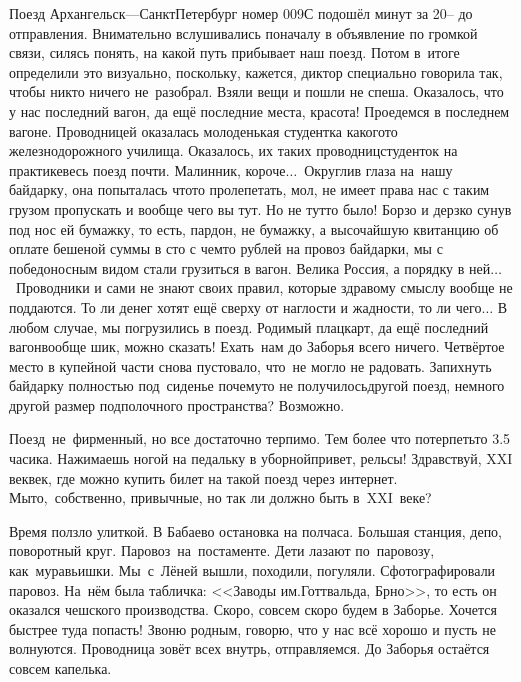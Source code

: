 Поезд Архангельск\thinspace\nobreakdash---\thinspace Санкт\sdash Петербург номер 009С подошёл минут за 20\thinspace\nobreakdash-- до отправления. Внимательно вслушивались поначалу в объявление по громкой связи, силясь понять, на какой путь прибывает наш поезд. Потом в~итоге определили это визуально, поскольку, кажется, диктор специально говорила так, чтобы никто ничего не~разобрал. Взяли вещи и пошли не спеша. Оказалось, что у нас последний вагон, да ещё последние места, красота! Проедемся в последнем вагоне. Проводницей оказалась молоденькая студентка какого\sdash то железнодорожного училища. Оказалось, их таких проводниц\sdash студенток на практике\mdash весь поезд почти. Малинник, короче$\ldots$~Округлив глаза на~нашу байдарку, она попыталась что\sdash то пролепетать, мол, не имеет права нас с таким грузом пропускать и вообще чего вы тут. Но не тут\sdash то было! Борзо и дерзко сунув под нос ей бумажку, то есть, пардон, не бумажку, а высочайшую квитанцию об оплате бешеной суммы в сто с чем\sdash то рублей на провоз байдарки, мы с победоносным видом стали грузиться в вагон. Велика Россия, а порядку в ней$\ldots$~Проводники и сами не знают своих правил, которые здравому смыслу вообще не поддаются. То ли денег хотят ещё сверху от наглости и жадности, то ли чего$\ldots$
\newpage
В любом случае, мы погрузились в поезд. Родимый плацкарт, да ещё последний вагон\mdash вообще шик, можно сказать! Ехать~нам до Заборья всего ничего. Четвёртое место в купейной части снова пустовало, что~не могло не радовать. Запихнуть байдарку полностью под~сиденье почему\sdash то не получилось\mdash другой поезд, немного другой размер подполочного пространства? Возможно. 

Поезд~не~фирменный, но все достаточно терпимо. Тем более что потерпеть\sdash то 3.5 часика. Нажимаешь ногой на педальку в уборной\mdash привет, рельсы! Здравствуй, XXI век\mdash век, где можно купить билет на такой поезд через интернет. Мы\sdash то,~собственно, привычные, но так ли должно быть в~XXI~веке?

Время ползло улиткой. В Бабаево остановка на полчаса. Большая станция, депо, поворотный круг. Паровоз~на~постаменте. Дети лазают по~паровозу, как~муравьишки. Мы~с~Лёней вышли, походили, погуляли. Сфотографировали паровоз. На~нём была табличка: <<Заводы им.\thinspace Готтвальда, Брно>>, то есть он оказался чешского производства. Скоро, совсем скоро будем в Заборье. Хочется быстрее туда попасть! Звоню родным, говорю, что у нас всё хорошо и пусть не волнуются. Проводница зовёт всех внутрь, отправляемся. До Заборья остаётся совсем капелька.

